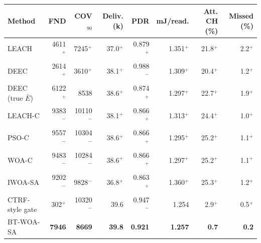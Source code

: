 \begin{tabular}{lrrrrrrr}
\toprule
Method & FND & COV$_{90}$ & Deliv. (k) & PDR & mJ/read. & Att. CH (\%) & Missed (\%) \\
\midrule
LEACH & 4611$^{+}$ & 7245$^{+}$ & 37.0$^{+}$ & 0.879$^{+}$ & 1.351$^{+}$ & 21.8$^{+}$ & 2.2$^{+}$ \\
DEEC & 2614$^{+}$ & 3610$^{+}$ & 38.1$^{+}$ & 0.988$^{-}$ & 1.309$^{+}$ & 20.4$^{+}$ & 1.2$^{+}$ \\
DEEC (true $\bar{E}$) & 6122$^{+}$ & 8538 & 38.6$^{+}$ & 0.874$^{+}$ & 1.297$^{+}$ & 22.7$^{+}$ & 1.9$^{+}$ \\
LEACH-C & 9383$^{-}$ & 10110$^{-}$ & 38.1$^{+}$ & 0.866$^{+}$ & 1.313$^{+}$ & 24.4$^{+}$ & 1.0$^{+}$ \\
PSO-C & 9557$^{-}$ & 10304$^{-}$ & 38.6$^{+}$ & 0.866$^{+}$ & 1.295$^{+}$ & 25.2$^{+}$ & 1.1$^{+}$ \\
WOA-C & 9483$^{-}$ & 10284$^{-}$ & 38.6$^{+}$ & 0.866$^{+}$ & 1.297$^{+}$ & 25.2$^{+}$ & 1.1$^{+}$ \\
IWOA-SA & 9202$^{-}$ & 9828$^{-}$ & 36.8$^{+}$ & 0.863$^{+}$ & 1.360$^{+}$ & 25.3$^{+}$ & 1.2$^{+}$ \\
CTRF-style gate & 302$^{+}$ & 10320$^{-}$ & 39.6 & 0.947$^{-}$ & 1.254 & 2.9$^{+}$ & 0.5$^{+}$ \\
BT-WOA-SA & \textbf{7946} & \textbf{8669} & \textbf{39.8} & \textbf{0.921} & \textbf{1.257} & \textbf{0.7} & \textbf{0.2} \\
\bottomrule
\end{tabular}
